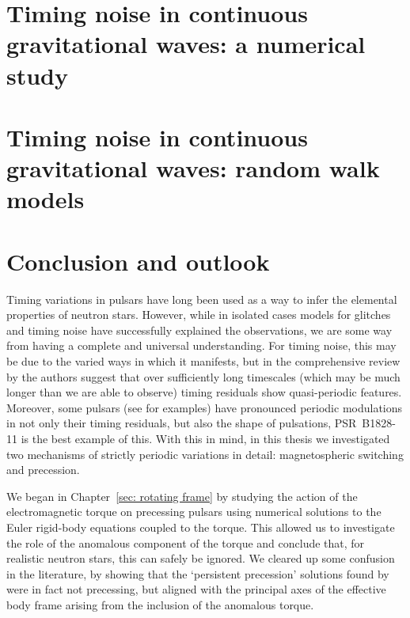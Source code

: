 \documentclass[twoside, 11pt]{thesis}
\begin{document}
\chapter{Timing noise in continuous gravitational waves: a numerical study}
\label{sec: timing noise in cgw}


\chapter{Timing noise in continuous gravitational waves: random walk models}
\label{sec: timing noise in cgw analytic}


\chapter{Conclusion and outlook}
\label{sec: final conclusion}

Timing variations in pulsars have long been used as a way to infer the
elemental properties of neutron stars. However, while in isolated cases models
for glitches and timing noise have successfully explained the observations, we
are some way from having a complete and universal understanding. For timing
noise, this may be due to the varied ways in which it manifests, but in the
comprehensive review by \citet{Hobbs2010} the authors suggest that over
sufficiently long timescales (which may be much longer than we are able to
observe) timing residuals show quasi-periodic features. Moreover, some pulsars
(see \citet{Lyne2010} for examples) have pronounced periodic modulations in not
only their timing residuals, but also the shape of pulsations, PSR~B1828-11 is
the best example of this.  With this in mind, in this thesis we investigated
two mechanisms of strictly periodic variations in detail: magnetospheric
switching and precession.

We began in Chapter~\ref{sec: rotating frame} by studying the action of the
electromagnetic torque on precessing pulsars using numerical solutions to the
Euler rigid-body equations coupled to the \citet{Deutsch1955} torque. This
allowed us to investigate the role of the anomalous component of the torque and
conclude that, for realistic neutron stars, this can safely be ignored. We
cleared up some confusion in the literature, by showing that the `persistent
precession' solutions found by \citet{Melatos2000} were in fact not
precessing, but aligned with the principal axes of the effective body frame
arising from the inclusion of the anomalous torque.
\end{document}
